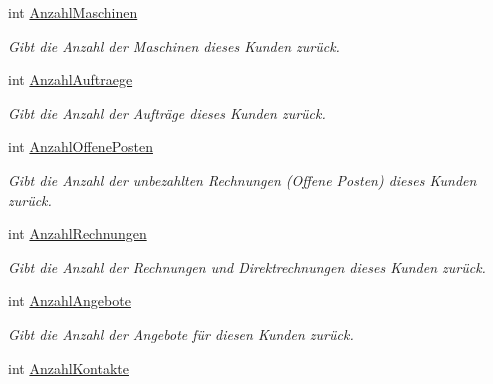 \begin{DoxyCompactItemize}
int \hyperlink{class_products_1_1_model_1_1_entities_1_1_kunde_aad68549551baab1fb9e42efdeb6e2368}{Anzahl\+Maschinen}
\begin{DoxyCompactList}\small\item\em Gibt die Anzahl der Maschinen dieses Kunden zurück. \end{DoxyCompactList}\item 
int \hyperlink{class_products_1_1_model_1_1_entities_1_1_kunde_a45a2d6e5926f35ddb7c7d0e6c2f56a83}{Anzahl\+Auftraege}
\begin{DoxyCompactList}\small\item\em Gibt die Anzahl der Aufträge dieses Kunden zurück. \end{DoxyCompactList}\item 
int \hyperlink{class_products_1_1_model_1_1_entities_1_1_kunde_a6e6a1c6f1edae64cbd35511a210bdc08}{Anzahl\+Offene\+Posten}
\begin{DoxyCompactList}\small\item\em Gibt die Anzahl der unbezahlten Rechnungen (Offene Posten) dieses Kunden zurück. \end{DoxyCompactList}\item 
int \hyperlink{class_products_1_1_model_1_1_entities_1_1_kunde_acad22e5452380df00637219a9ecfd41a}{Anzahl\+Rechnungen}
\begin{DoxyCompactList}\small\item\em Gibt die Anzahl der Rechnungen und Direktrechnungen dieses Kunden zurück. \end{DoxyCompactList}\item 
int \hyperlink{class_products_1_1_model_1_1_entities_1_1_kunde_a587f996868b9d8de13d20b227b72ad14}{Anzahl\+Angebote}
\begin{DoxyCompactList}\small\item\em Gibt die Anzahl der Angebote für diesen Kunden zurück. \end{DoxyCompactList}\item 
int \hyperlink{class_products_1_1_model_1_1_entities_1_1_kunde_aa0ad94515b3f9e049a4442c4e275d93b}{Anzahl\+Kontakte}

\end{DoxyCompactItemize}
